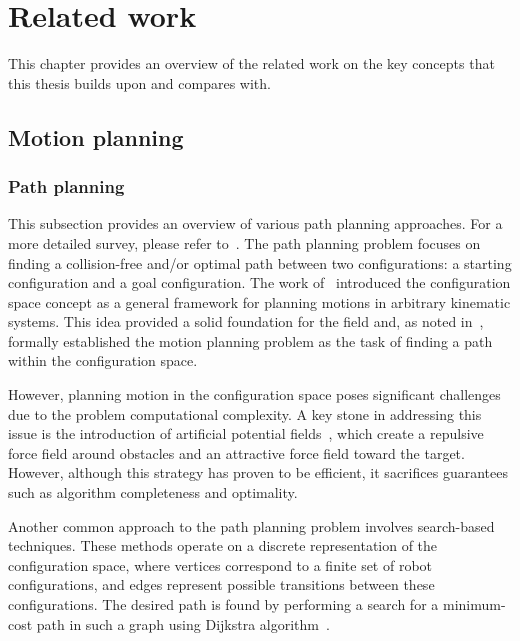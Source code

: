 \chapter{Related work}\label{chap:related_work}

This chapter provides an overview of the related work on the key concepts that this thesis builds upon and compares with.

\section{Motion planning}

\subsection{Path planning}

This subsection provides an overview of various path planning approaches. 
For a more detailed survey, please refer to~\cite{cLavalle, cKavraki, cFrazzoli}.
The path planning problem focuses on finding a collision-free and/or optimal path between two configurations: a starting configuration and a goal configuration. 
The work of~\cite{cConfigSpace} introduced the configuration space concept as a general framework for planning motions in arbitrary kinematic systems.
This idea provided a solid foundation for the field and, as noted in~\cite{cSpatialPlan}, formally established the motion planning problem as the task of finding a path within the configuration space.

However, planning motion in the configuration space poses significant challenges due to the problem computational complexity. 
A key stone in addressing this issue is the introduction of artificial potential fields~\cite{cAPF}, which create a repulsive force field around obstacles and an attractive force field toward the target.
However, although this strategy has proven to be efficient, it sacrifices guarantees such as algorithm completeness and optimality.

Another common approach to the path planning problem involves search-based techniques. 
These methods operate on a discrete representation of the configuration space, where vertices correspond to a finite set of robot configurations, and edges represent possible transitions between these configurations.
The desired path is found by performing a search for a minimum-cost path in such a graph using Dijkstra algorithm~\cite{cDijk}. 

